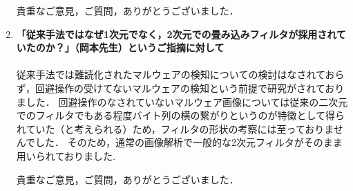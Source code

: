 \documentclass[11pt, a4paper]{article}
\begin{document}
\begin{enumerate}
	貴重なご意見，ご質問，ありがとうございました．


  \item \textbf{「従来手法ではなぜ1次元でなく，2次元での畳み込みフィルタが採用されていたのか？」（岡本先生）というご指摘に対して}\\ \\
	従来手法では難読化されたマルウェアの検知についての検討はなされておらず，回避操作の受けてないマルウェアの検知という前提で研究がされておりました．
	回避操作のなされていないマルウェア画像については従来の二次元でのフィルタでもある程度バイト列の横の繋がりというのが特徴として得られていた（と考えられる）ため，フィルタの形状の考察には至っておりませんでした．
	そのため，通常の画像解析で一般的な2次元フィルタがそのまま用いられておりました.
    
	貴重なご意見，ご質問，ありがとうございました．
  \vspace{10mm}
\end{enumerate}
\end{document}
